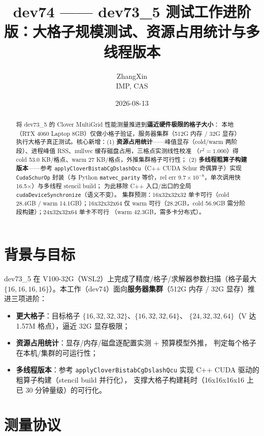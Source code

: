 \documentclass[11pt,a4paper]{article}
\title{\textbf{dev74 —— dev73\_5 测试工作进阶版：大格子规模测试、资源占用统计与多线程版本}}
\author{ZhangXin \\ IMP, CAS}
\date{2026-08-13}
\begin{document}
\maketitle

\begin{abstract}
将 dev73\_5 的 Clover MultiGrid 性能测量推进到\textbf{逼近硬件极限的格子大小}：
本地（RTX 4060 Laptop 8GB）仅做小格子验证，服务器集群（512G 内存 / 32G 显存）
执行大格子真正测试。核心新增：(1) \textbf{资源占用统计}——峰值显存（cold/warm
两阶段）、进程峰值 RSS、nullvec 缓存磁盘占用，三格点实测线性校准
（$r^2=1.000$）得 cold 53.0 KB/格点、warm 27 KB/格点，外推集群格子可行性；
(2) \textbf{多线程粗算子构建版本}——参考
\texttt{applyCloverBistabCgDslashQcu}（C++ CUDA Schur 奇偶算子）实现
\texttt{CudaSchurOp} 封装（与 Python \texttt{matvec\_parity} 等价，rel err
$9.7\times10^{-8}$，单次调用快 16.5$\times$）与多线程 stencil build；
为此移除 C++ 入口/出口的全局 \texttt{cudaDeviceSynchronize}（语义不变）。
集群预测：16x32x32x32 单卡可行（cold 28.4GB / warm 14.1GB）；16x32x32x64
仅 warm 可行（28.2GB，cold 56.9GB 需分阶段构建）；24x32x32x64 单卡不可行
（warm 42.3GB，需多卡分布式）。
\end{abstract}

\tableofcontents

\section{背景与目标}
\label{sec:bg}

dev73\_5 在 V100-32G（WSL2）上完成了精度/格子/求解器参数扫描（格子最大
$\{16,16,16,16\}$）。本工作（dev74）面向\textbf{服务器集群}（512G 内存 /
32G 显存）推进三项进阶：

\begin{itemize}
  \item \textbf{更大格子}：目标格子 $\{16,32,32,32\}$、$\{16,32,32,64\}$、
    $\{24,32,32,64\}$（V 达 1.57M 格点），逼近 32G 显存极限；
  \item \textbf{资源占用统计}：显存/内存/磁盘逐配置实测 + 预算模型外推，
    判定每个格子在本机/集群的可运行性；
  \item \textbf{多线程版本}：参考 \texttt{applyCloverBistabCgDslashQcu}
    实现 C++ CUDA 驱动的粗算子构建（stencil build 并行化），
    支撑大格子构建耗时（16x16x16x16 上已 30 分钟量级）的可行化。
\end{itemize}

\section{测量协议}
\label{sec:proto}
\end{document}
